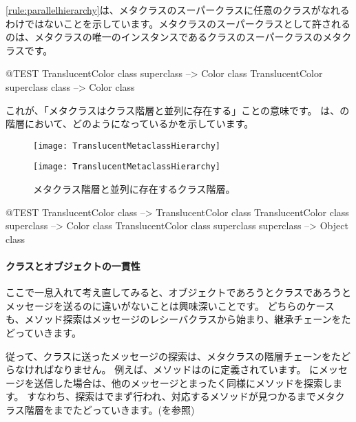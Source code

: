 \documentclass[a4paper,10pt,twoside]{book}
\begin{document}
\ref{rule:parallelhierarchy}は、メタクラスのスーパークラスに任意のクラスがなれるわけではないことを示しています。メタクラスのスーパークラスとして許されるのは、メタクラスの唯一のインスタンスであるクラスのスーパークラスのメタクラスです。

\begin{code}{@TEST}
TranslucentColor class superclass --> Color class
TranslucentColor superclass class --> Color class
\end{code}

\noindent
これが、「メタクラスはクラス階層と並列に存在する」ことの意味です。 は、の階層において、どのようになっているかを示しています。

\begin{center}
\begin{figure}[!ht]
\ifluluelse
	{\centerline {\texttt{[image: TranslucentMetaclassHierarchy]}}}
	{\centerline {\texttt{[image: TranslucentMetaclassHierarchy]}}}
\caption{メタクラス階層と並列に存在するクラス階層。}
\end{figure}
\end{center}

\begin{code}{@TEST}
TranslucentColor class                                     --> TranslucentColor class
TranslucentColor class superclass                   --> Color class
TranslucentColor class superclass superclass --> Object class
\end{code}

\paragraph{クラスとオブジェクトの一貫性}
ここで一息入れて考え直してみると、オブジェクトであろうとクラスであろうとメッセージを送るのに違いがないことは興味深いことです。
どちらのケースも、メソッド探索はメッセージのレシーバクラスから始まり、継承チェーンをたどっていきます。

従って、クラスに送ったメッセージの探索は、メタクラスの階層チェーンをたどらなければなりません。
例えば、メソッドはのに定義されています。
にメッセージを送信した場合は、他のメッセージとまったく同様にメソッドを探索します。
すなわち、探索はでまず行われ、対応するメソッドが見つかるまでメタクラス階層をまでたどっていきます。(を参照)
\end{document}

